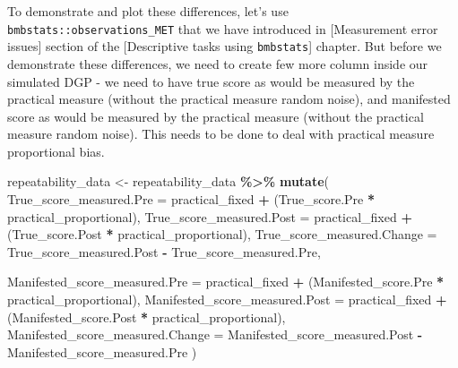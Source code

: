 \documentclass[
]{book}
\newenvironment{Shaded}{\begin{snugshade}}{\end{snugshade}}
\newcommand{\DataTypeTok}[1]{\textcolor[rgb]{0.13,0.29,0.53}{#1}}
\newcommand{\KeywordTok}[1]{\textcolor[rgb]{0.13,0.29,0.53}{\textbf{#1}}}
\newcommand{\NormalTok}[1]{#1}
\newcommand{\OperatorTok}[1]{\textcolor[rgb]{0.81,0.36,0.00}{\textbf{#1}}}
\newcommand{\StringTok}[1]{\textcolor[rgb]{0.31,0.60,0.02}{#1}}
\begin{document}
To demonstrate and plot these differences, let's use \texttt{bmbstats::observations\_MET} that we have introduced in {[}Measurement error issues{]} section of the {[}Descriptive tasks using \texttt{bmbstats}{]} chapter. But before we demonstrate these differences, we need to create few more column inside our simulated DGP - we need to have true score as would be measured by the practical measure (without the practical measure random noise), and manifested score as would be measured by the practical measure (without the practical measure random noise). This needs to be done to deal with practical measure proportional bias.

\begin{Shaded}
\begin{Highlighting}[]
\NormalTok{repeatability\_data <{-}}\StringTok{ }\NormalTok{repeatability\_data }\OperatorTok{\%>\%}
\StringTok{  }\KeywordTok{mutate}\NormalTok{(}
    \DataTypeTok{True\_score\_measured.Pre =}\NormalTok{ practical\_fixed }\OperatorTok{+}\StringTok{ }\NormalTok{(True\_score.Pre }\OperatorTok{*}\StringTok{ }\NormalTok{practical\_proportional),}
    \DataTypeTok{True\_score\_measured.Post =}\NormalTok{ practical\_fixed }\OperatorTok{+}\StringTok{ }\NormalTok{(True\_score.Post }\OperatorTok{*}\StringTok{ }\NormalTok{practical\_proportional),}
    \DataTypeTok{True\_score\_measured.Change =}\NormalTok{ True\_score\_measured.Post }\OperatorTok{{-}}\StringTok{ }\NormalTok{True\_score\_measured.Pre,}
    
    \DataTypeTok{Manifested\_score\_measured.Pre =}\NormalTok{ practical\_fixed }\OperatorTok{+}\StringTok{ }\NormalTok{(Manifested\_score.Pre }\OperatorTok{*}\StringTok{ }\NormalTok{practical\_proportional),}
    \DataTypeTok{Manifested\_score\_measured.Post =}\NormalTok{ practical\_fixed }\OperatorTok{+}\StringTok{ }\NormalTok{(Manifested\_score.Post }\OperatorTok{*}\StringTok{ }\NormalTok{practical\_proportional),}
    \DataTypeTok{Manifested\_score\_measured.Change =}\NormalTok{ Manifested\_score\_measured.Post }\OperatorTok{{-}}\StringTok{ }\NormalTok{Manifested\_score\_measured.Pre}
\NormalTok{  )}


\end{Highlighting}
\end{Shaded}
\end{document}
